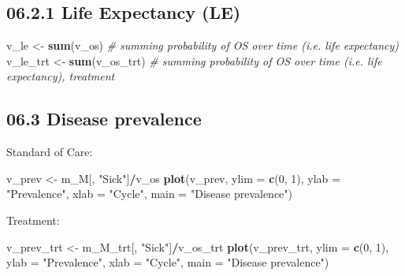 \documentclass[
]{article}
\newenvironment{Shaded}{\begin{snugshade}}{\end{snugshade}}
\newcommand{\CommentTok}[1]{\textcolor[rgb]{0.56,0.35,0.01}{\textit{#1}}}
\newcommand{\DataTypeTok}[1]{\textcolor[rgb]{0.13,0.29,0.53}{#1}}
\newcommand{\DecValTok}[1]{\textcolor[rgb]{0.00,0.00,0.81}{#1}}
\newcommand{\KeywordTok}[1]{\textcolor[rgb]{0.13,0.29,0.53}{\textbf{#1}}}
\newcommand{\NormalTok}[1]{#1}
\newcommand{\OperatorTok}[1]{\textcolor[rgb]{0.81,0.36,0.00}{\textbf{#1}}}
\newcommand{\StringTok}[1]{\textcolor[rgb]{0.31,0.60,0.02}{#1}}
\begin{document}
\hypertarget{life-expectancy-le}{%
\subsection{06.2.1 Life Expectancy (LE)}\label{life-expectancy-le}}

\begin{Shaded}
\begin{Highlighting}[]
\NormalTok{v_le     <-}\StringTok{ }\KeywordTok{sum}\NormalTok{(v_os)      }\CommentTok{# summing probability of OS over time (i.e. life expectancy)}
\NormalTok{v_le_trt <-}\StringTok{ }\KeywordTok{sum}\NormalTok{(v_os_trt)  }\CommentTok{# summing probability of OS over time (i.e. life expectancy), treatment}
\end{Highlighting}
\end{Shaded}

\hypertarget{disease-prevalence}{%
\subsection{06.3 Disease prevalence}\label{disease-prevalence}}

Standard of Care:

\begin{Shaded}
\begin{Highlighting}[]
\NormalTok{v_prev <-}\StringTok{ }\NormalTok{m_M[, }\StringTok{"Sick"}\NormalTok{]}\OperatorTok{/}\NormalTok{v_os}
\KeywordTok{plot}\NormalTok{(v_prev,}
     \DataTypeTok{ylim =} \KeywordTok{c}\NormalTok{(}\DecValTok{0}\NormalTok{, }\DecValTok{1}\NormalTok{),}
     \DataTypeTok{ylab =} \StringTok{"Prevalence"}\NormalTok{,}
     \DataTypeTok{xlab =} \StringTok{"Cycle"}\NormalTok{,}
     \DataTypeTok{main =} \StringTok{"Disease prevalence"}\NormalTok{)}
\end{Highlighting}
\end{Shaded}

Treatment:

\begin{Shaded}
\begin{Highlighting}[]
\NormalTok{v_prev_trt <-}\StringTok{ }\NormalTok{m_M_trt[, }\StringTok{"Sick"}\NormalTok{]}\OperatorTok{/}\NormalTok{v_os_trt}
\KeywordTok{plot}\NormalTok{(v_prev_trt,}
     \DataTypeTok{ylim =} \KeywordTok{c}\NormalTok{(}\DecValTok{0}\NormalTok{, }\DecValTok{1}\NormalTok{),}
     \DataTypeTok{ylab =} \StringTok{"Prevalence"}\NormalTok{,}
     \DataTypeTok{xlab =} \StringTok{"Cycle"}\NormalTok{,}
     \DataTypeTok{main =} \StringTok{"Disease prevalence"}\NormalTok{)}
\end{Highlighting}
\end{Shaded}
\end{document}
